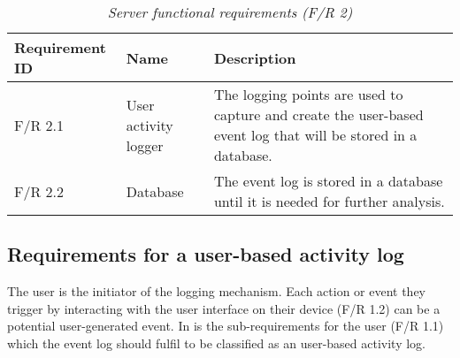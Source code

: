 \begin{table}[!htb]
	\centering
	\caption[Server functional requirements]
	{\textit{Server functional requirements (F/R 2)}}
	\label{tbl:ch2_serverInterfaceRequirements}
	\begin{tabularx}{\textwidth}{|l|l|X|}
		\hline \textbf{Requirement ID} & \textbf{Name} & \textbf{Description} \\
		\hline F/R 2.1 & User activity logger & The logging points are used to capture and create the user-based event log that will be stored in a database.\\
		\hline F/R 2.2 & Database & The event log is stored in a database until it is needed for further analysis.\\
		\hline
	\end{tabularx}
\end{table}

\subsection{Requirements for a user-based activity log}\label{sec:ch2_requirementsOfUAT}
The user is the initiator of the logging mechanism. Each action or event they trigger by interacting with the user interface on their device (F/R 1.2) can be a potential user-generated event. In
 is the sub-requirements for the user (F/R 1.1) which the event log should fulfil to be classified as an user-based activity log.

